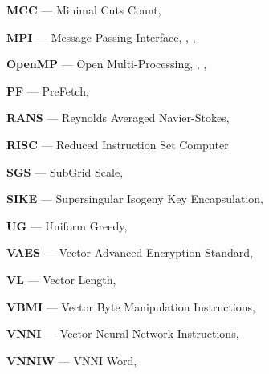 \textbf{MCC} --- Minimal Cuts Count, \pageref{abbr:mcc}

\textbf{MPI} --- Message Passing Interface, \pageref{abbr:mpi}, \pageref{abbr:mpi2}, \pageref{abbr:mpi3}

\textbf{OpenMP} --- Open Multi-Processing, \pageref{abbr:openmp}, \pageref{abbr:openmp2}, \pageref{abbr:openmp3}

\textbf{PF} --- PreFetch, \pageref{abbr:pf}

\textbf{RANS} --- Reynolds Averaged Navier-Stokes, \pageref{abbr:rans}

\textbf{RISC} --- Reduced Instruction Set Computer

\textbf{SGS} --- SubGrid Scale, \pageref{abbr:sgs}

\textbf{SIKE} --- Supersingular Isogeny Key Encapsulation, \pageref{abbr:sike}

\textbf{UG} --- Uniform Greedy, \pageref{abbr:ug}

\textbf{VAES} --- Vector Advanced Encryption Standard, \pageref{abbr:vaes}

\textbf{VL} --- Vector Length, \pageref{abbr:vl}

\textbf{VBMI} --- Vector Byte Manipulation Instructions, \pageref{abbr:vbmi}

\textbf{VNNI} --- Vector Neural Network Instructions, \pageref{abbr:vnni}

\textbf{VNNIW} --- VNNI Word, \pageref{abbr:vnniw}
